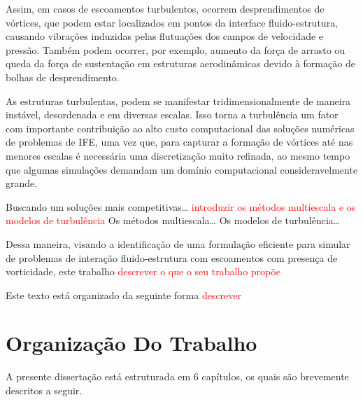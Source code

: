 Assim, em casos de escoamentos turbulentos, ocorrem desprendimentos de vórtices, que podem estar localizados em pontos da interface fluido-estrutura, causando vibrações induzidas pelas flutuações dos campos de velocidade e pressão. Também podem ocorrer, por exemplo, aumento da força de arrasto ou queda da força de sustentação em estruturas aerodinâmicas devido à formação de bolhas de desprendimento.

As estruturas turbulentas, podem se manifestar tridimensionalmente de maneira instável, desordenada e em diversas escalas. Isso torna a turbulência um fator com importante contribuição ao alto custo computacional das soluções numéricas de problemas de IFE, uma vez que, para capturar a formação de vórtices até nas menores escalas é necessária uma discretização muito refinada, ao mesmo tempo que algumas simulações demandam um domínio computacional consideravelmente grande. 

Buscando um soluções mais competitivas… \textcolor{red}{introduzir os métodos multiescala e os modelos de turbulência} Os métodos multiescala… Os modelos de turbulência…



Dessa maneira, visando a identificação de uma formulação eficiente para simular de problemas de interação fluido-estrutura com escoamentos com presença de vorticidade, este trabalho \textcolor{red}{descrever o que o seu trabalho propõe} 

Este texto está organizado da seguinte forma \textcolor{red}{descrever}


\section{Organização Do Trabalho}

A presente dissertação está estruturada em 6 capítulos, os quais são brevemente descritos a seguir.

